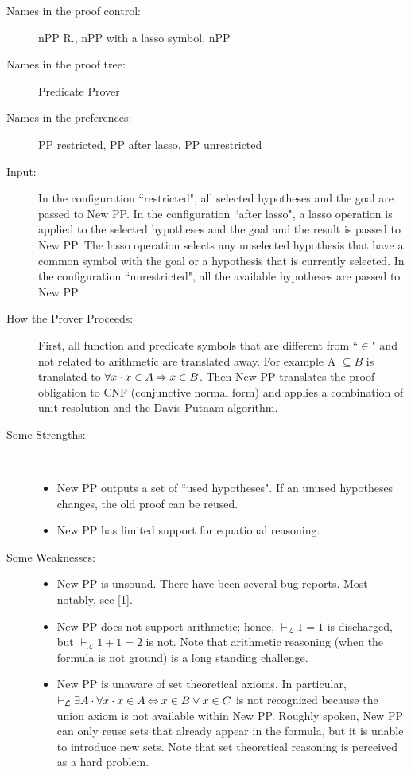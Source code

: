 \begin{description}
	\item[Names in the proof control:] nPP R., nPP with a lasso symbol, nPP
	\item[Names in the proof tree:] Predicate Prover
	\item[Names in the preferences:] PP restricted, PP after lasso, PP unrestricted
	\item[Input:] In the configuration ``restricted", all selected hypotheses and the goal are passed to New PP. In the configuration ``after lasso", a lasso operation is applied to the selected hypotheses and the goal and the result is passed to New PP. The lasso operation selects any unselected hypothesis that have a common symbol with the goal or a hypothesis that is currently selected. In the configuration ``unrestricted", all the available hypotheses are passed to New PP.
	\item[How the Prover Proceeds:] First, all function and predicate symbols that are different from ``$\in$" and not related to arithmetic are translated away. For example A $\subseteq B$ is translated to $\forall x\cdot x \in A \mathbin\Rightarrow x \in B$. Then New PP translates the proof obligation to CNF (conjunctive normal form) and applies a combination of unit resolution and the Davis Putnam algorithm.
	\item[Some Strengths:] ~
	\begin{itemize}
		\item New PP outputs a set of ``used hypotheses". If an unused hypotheses changes, the old proof can be reused.
		\item New PP has limited support for equational reasoning. 
	\end{itemize}
	\item[Some Weaknesses:]
	\begin{itemize} ~
		\item New PP is unsound. There have been several bug reports. Most notably, see [1]. 
		\item New PP does not support arithmetic; hence, $\vdash_{\mathcal L} 1=1$ is discharged, but $\vdash_{\mathcal L} 1+1=2$ is not. Note that arithmetic 	reasoning (when the formula is not ground) is a long standing challenge.
		\item New PP is unaware of set theoretical axioms. In particular, $\vdash_{\mathcal L} \exists A\cdot \forall x\cdot x \in A \mathbin\Leftrightarrow x \in B \lor x \in C$ is not recognized because the union axiom is not available within New PP. Roughly spoken, New PP can only reuse sets that already appear in the formula, but it is unable to introduce new sets. Note that set theoretical reasoning is perceived as a hard problem.

\end{itemize}
\end{description}
